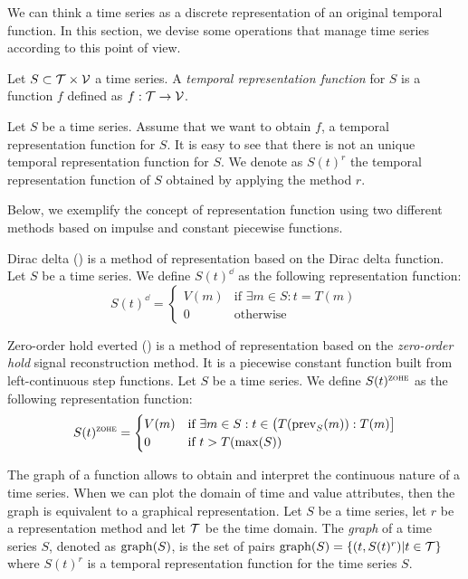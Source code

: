 We can think a time series as a discrete representation of an original
temporal function. In this section, we devise some operations that
manage time series according to this point of view.

Let $S\subset\cal{T}\times\cal{V}$ a time series.  A \emph{temporal
  representation function} for $S$ is a function $f$ defined as
$f:\mathcal{T}\rightarrow\cal{V}$.

Let $S$ be a time series. Assume that we want to obtain $f$, a temporal
representation function for $S$. It is easy to see that there is not
an unique temporal representation function for $S$. We denote as
$S(t)^r$ the temporal representation function of $S$ obtained by
applying the method $r$.

Below, we exemplify the concept of representation function using two
different methods based on impulse and constant piecewise functions.

\begin{definition} 
  Dirac delta (\dd) is a method of representation based on the Dirac
  delta function. Let $S$ be a time series. We define $S(t)^\dd$ as
  the following \dd{} representation function:
  \[
  S(t)^\dd
  =  \begin{cases}
          V(m) & \text{if } \exists m\in S:t=T(m) \\
          0    & \text{otherwise}
  \end{cases}
  \]
\end{definition}

\begin{definition}
  Zero-order hold everted (\zohe{}) is a method of representation
  based on the \emph{zero-order hold} signal reconstruction method. It
  is a piecewise constant function built from left-continuous step
  functions.  Let $S$ be a time series. We define $S(t)^\zohe$ as the
  following representation function:
  \[
  S(t)^\zohe 
  = \begin{cases}
    V(m) & \text{if } \exists m\in S: t\in \big(T(\prev_S(m)):T(m)\big]\\
    0    & \text{if } t > T(\max(S)) 
  \end{cases}
  \]
\end{definition}

The graph of a function allows to obtain and interpret the continuous
nature of a time series. When we can plot the domain of time and value
attributes, then the graph is equivalent to a graphical
representation.
%
Let $S$ be a time series, let $r$ be a representation method and let
$\cal{T}$ be the time domain. The \emph{graph} of a time series $S$,
denoted as $\operatorname*{graph}(S)$, is the set of pairs $\operatorname*{graph}(S)
=\{(t,S(t)^r)|t\in \cal{T}\}$ where $S(t)^r$ is a temporal
representation function for the time series $S$.


